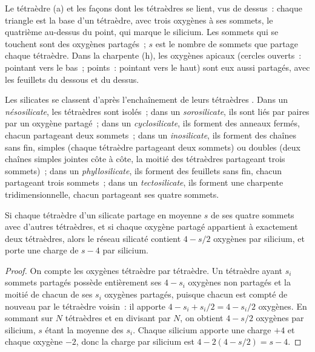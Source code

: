 \begin{omfigure}
{\small Le tétraèdre  (a) et les façons dont les tétraèdres se lient,
vus de dessus~: chaque triangle est la base d'un tétraèdre, avec trois oxygènes à
ses sommets, le quatrième au-dessus du point, qui marque le silicium. Les sommets
qui se touchent sont des oxygènes partagés~; $s$ est le nombre de sommets que
partage chaque tétraèdre. Dans la charpente (h), les oxygènes apicaux (cercles
ouverts~: pointant vers le bas~; points~: pointant vers le haut) sont eux aussi
partagés, avec les feuillets du dessous et du dessus.}
\end{omfigure}

\begin{definition}\label{def:b1:rock-forming-minerals:silicate-classes}
Les silicates se classent d'après l'enchaînement de leurs tétraèdres .
Dans un \emph{nésosilicate}, les tétraèdres sont isolés~; dans un
\emph{sorosilicate}, ils sont liés par paires par un oxygène
partagé~; dans un \emph{cyclosilicate}, ils forment des
anneaux fermés, chacun partageant deux sommets~; dans un \emph{inosilicate},
ils forment des chaînes sans fin, simples (chaque tétraèdre partageant deux
sommets) ou doubles (deux chaînes simples jointes côte à côte, la moitié des
tétraèdres partageant trois sommets)~; dans un \emph{phyllosilicate}, ils forment
des feuillets sans fin, chacun partageant trois sommets~; dans un
\emph{tectosilicate}, ils forment une charpente
tridimensionnelle, chacun partageant ses quatre sommets.
\end{definition}

\begin{proposition}\label{prop:b1:rock-forming-minerals:si-o}
Si chaque tétraèdre  d'un silicate partage en moyenne $s$ de ses quatre
sommets avec d'autres tétraèdres, et si chaque oxygène partagé appartient à
exactement deux tétraèdres, alors le réseau silicaté contient $4 - s/2$ oxygènes
par silicium, et porte une charge de $s - 4$ par silicium.
\end{proposition}

\begin{proof}
On compte les oxygènes tétraèdre par tétraèdre. Un tétraèdre ayant $s_i$ sommets
partagés possède entièrement ses $4 - s_i$ oxygènes non partagés et la moitié de
chacun de ses $s_i$ oxygènes partagés, puisque chacun est compté de nouveau par
le tétraèdre voisin~: il apporte $4 - s_i + s_i/2 = 4 - s_i/2$ oxygènes. En
sommant sur $N$ tétraèdres et en divisant par $N$, on obtient $4 - s/2$ oxygènes
par silicium, $s$ étant la moyenne des $s_i$. Chaque silicium apporte une charge
$+4$ et chaque oxygène $-2$, donc la charge par silicium est
$4 - 2(4 - s/2) = s - 4$.
\end{proof}

